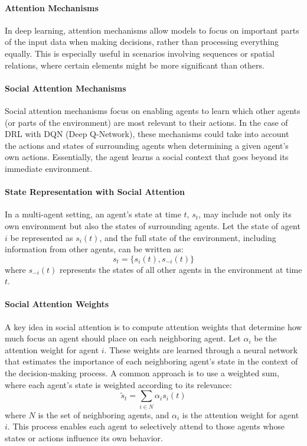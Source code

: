 \begin{enumerate}
\paragraph{Attention Mechanisms} 
In deep learning, attention mechanisms allow models to focus on important parts of the input data when making decisions, 
rather than processing everything equally\cite{vaswani2017attention}. 
This is especially useful in scenarios involving sequences or spatial relations, where certain elements might be more significant than others.

\paragraph{Social Attention Mechanisms} 
Social attention mechanisms focus on enabling agents to learn which other agents (or parts of the environment) are most relevant to their actions. 
In the case of DRL with DQN (Deep Q-Network), these mechanisms could take into account the actions and states of surrounding agents when determining a given agent's own actions. 
Essentially, the agent learns a social context that goes beyond its immediate environment\cite{jiang2018learning}.


\paragraph{State Representation with Social Attention} 
In a multi-agent setting, an agent’s state at time $t$, $s_t$, may include not only its own environment but also the states of surrounding agents. Let the state of agent $i$ be represented as $s_i(t)$, and the full state of the environment, including information from other agents, can be written as:
\[
s_t = \{s_i(t), s_{-i}(t)\}
\]
where $s_{-i}(t)$ represents the states of all other agents in the environment at time $t$\cite{mnih2015dqn}.

\paragraph{Social Attention Weights} 
A key idea in social attention is to compute attention weights that determine how much focus an agent should place on each neighboring agent. Let $\alpha_i$ be the attention weight for agent $i$. These weights are learned through a neural network that estimates the importance of each neighboring agent's state in the context of the decision-making process. A common approach is to use a weighted sum, where each agent’s state is weighted according to its relevance:
\[
\tilde{s}_t = \sum_{i \in N} \alpha_i s_i(t)
\]
where $N$ is the set of neighboring agents, and $\alpha_i$ is the attention weight for agent $i$. This process enables each agent to selectively attend to those agents whose states or actions influence its own behavior.


\end{enumerate}
